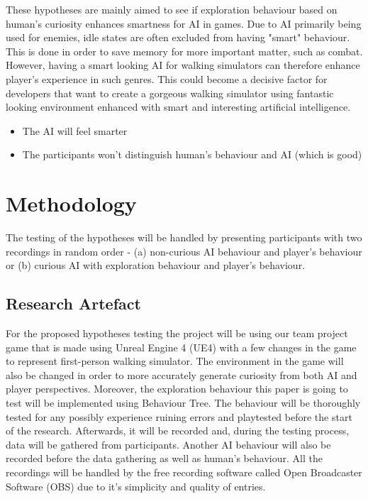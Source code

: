\documentclass[journal]{IEEEtran}
\begin{document}
These hypotheses are mainly aimed to see if exploration behaviour based on human's curiosity enhances smartness for AI in games. Due to AI primarily being used for enemies, idle states are often excluded from having "smart" behaviour. This is done in order to save memory for more important matter, such as combat. However, having a smart looking AI for walking simulators can therefore enhance player's experience in such genres. This could become a decisive factor for developers that want to create a gorgeous walking simulator using fantastic looking environment enhanced with smart and interesting artificial intelligence.
\begin{itemize}
	\item The AI will feel smarter
	\item The participants won't distinguish human's behaviour and AI (which is good)
\end{itemize}

\section{Methodology}
The testing of the hypotheses will be handled by presenting participants with two recordings in random order - (a) non-curious AI behaviour and player's behaviour or (b) curious AI with exploration behaviour and player's behaviour.

\subsection{Research Artefact}
For the proposed hypotheses testing the project will be using our team project game that is made using Unreal Engine 4 (UE4) with a few changes in the game to represent first-person walking simulator. The environment in the game will also be changed in order to more accurately generate curiosity from both AI and player perspectives. Moreover, the exploration behaviour this paper is going to test will be implemented using Behaviour Tree. The behaviour will be thoroughly tested for any possibly experience ruining errors and playtested before the start of the research. Afterwards, it will be recorded and, during the testing process, data will be gathered from participants. Another AI behaviour will also be recorded before the data gathering as well as human's behaviour. All the recordings will be handled by the free recording software called Open Broadcaster Software (OBS) due to it's simplicity and quality of entries.
\end{document}
